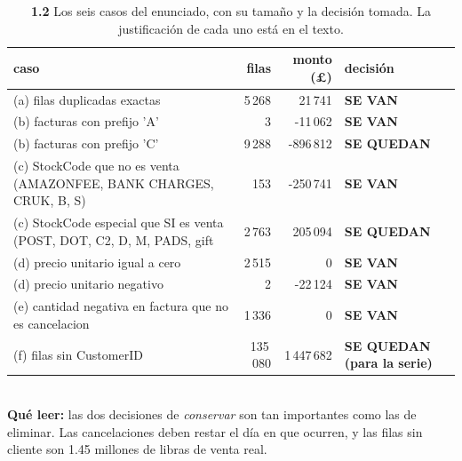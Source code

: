 \begin{table}[htbp]
\centering
\footnotesize
\caption{\textbf{1.2} Los seis casos del enunciado, con su tama\~no y la decisi\'on tomada. La justificaci\'on de cada uno est\'a en el texto.}
\label{tab:p1_casos}
\begin{tabular}{p{8.3cm}rrl}
\toprule
\textbf{caso} & \textbf{filas} & \textbf{monto (\pounds)} & \textbf{decisi\'on} \\
\midrule
(a) filas duplicadas exactas & 5\,268 & 21\,741 & \textbf{SE VAN} \\
(b) facturas con prefijo 'A' & 3 & -11\,062 & \textbf{SE VAN} \\
(b) facturas con prefijo 'C' & 9\,288 & -896\,812 & \textbf{SE QUEDAN} \\
(c) StockCode que no es venta (AMAZONFEE, BANK CHARGES, CRUK, B, S) & 153 & -250\,741 & \textbf{SE VAN} \\
(c) StockCode especial que SI es venta (POST, DOT, C2, D, M, PADS, gift\ & 2\,763 & 205\,094 & \textbf{SE QUEDAN} \\
(d) precio unitario igual a cero & 2\,515 & 0 & \textbf{SE VAN} \\
(d) precio unitario negativo & 2 & -22\,124 & \textbf{SE VAN} \\
(e) cantidad negativa en factura que no es cancelacion & 1\,336 & 0 & \textbf{SE VAN} \\
(f) filas sin CustomerID & 135\,080 & 1\,447\,682 & \textbf{SE QUEDAN (para la serie)} \\
\bottomrule
\end{tabular}
\\[0.3em]{\scriptsize \textbf{Qu\'e leer:} las dos decisiones de \emph{conservar} son tan importantes como las de eliminar. Las cancelaciones deben restar el d\'ia en que ocurren, y las filas sin cliente son 1.45 millones de libras de venta real.}
\end{table}

